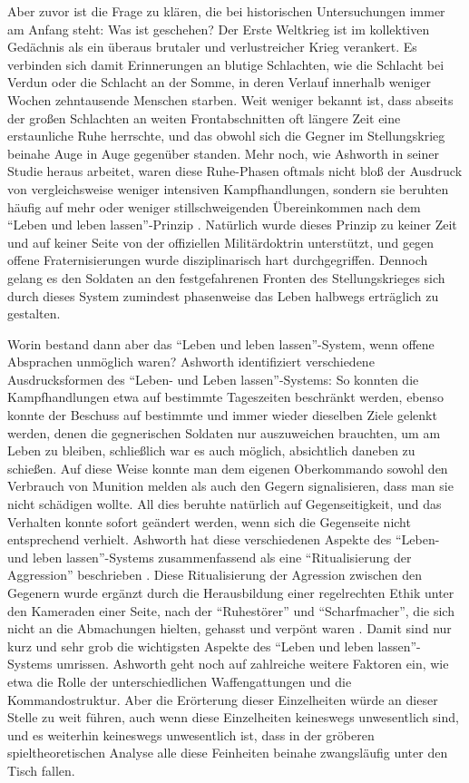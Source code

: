 \documentclass[12pt,a4paper,ngerman]{article}
\begin{document}
Aber zuvor ist die Frage zu klären, die bei historischen
Untersuchungen immer am Anfang steht: Was ist geschehen? Der
Erste Weltkrieg ist im kollektiven Gedächnis als ein überaus brutaler
und verlustreicher Krieg verankert. Es verbinden sich damit
Erinnerungen an blutige Schlachten, wie die Schlacht bei Verdun oder
die Schlacht an der Somme, in deren Verlauf innerhalb weniger Wochen
zehntausende Menschen starben\cite[S. 52]{james:2003}. Weit weniger
bekannt ist, dass abseits der großen Schlachten an weiten
Frontabschnitten oft längere Zeit eine erstaunliche Ruhe herrschte,
und das obwohl sich die Gegner im Stellungskrieg beinahe Auge in Auge
gegenüber standen. Mehr noch, wie Ashworth in seiner Studie heraus
arbeitet, waren diese Ruhe-Phasen oftmals nicht bloß der Ausdruck von
vergleichsweise weniger intensiven Kampfhandlungen, sondern sie
beruhten häufig auf mehr oder weniger stillschweigenden Übereinkommen
nach dem "`Leben und leben lassen"'-Prinzip
\cite[S. 24ff.]{ashworth:1980}. Natürlich wurde dieses Prinzip zu
keiner Zeit und auf keiner Seite von der offiziellen Militärdoktrin
unterstützt, und gegen offene Fraternisierungen wurde disziplinarisch
hart durchgegriffen. Dennoch gelang es den Soldaten an den
festgefahrenen Fronten des Stellungskrieges sich durch dieses System
zumindest phasenweise das Leben halbwegs erträglich zu gestalten.

Worin bestand dann aber das "`Leben und leben lassen"'-System, wenn
offene Absprachen unmöglich waren? Ashworth identifiziert verschiedene
Ausdrucksformen des "`Leben- und Leben lassen"'-Systems: So konnten
die Kampfhandlungen etwa auf bestimmte Tageszeiten beschränkt werden,
ebenso konnte der Beschuss auf bestimmte und immer wieder dieselben
Ziele gelenkt werden, denen die gegnerischen Soldaten nur auszuweichen
brauchten, um am Leben zu bleiben, schließlich war es auch möglich,
absichtlich daneben zu schießen. Auf diese Weise konnte man dem
eigenen Oberkommando sowohl den Verbrauch von Munition melden als
auch den Gegern signalisieren, dass man sie nicht schädigen wollte. All
dies beruhte natürlich auf Gegenseitigkeit, und das Verhalten konnte
sofort geändert werden, wenn sich die Gegenseite nicht entsprechend
verhielt. Ashworth hat diese verschiedenen Aspekte des "`Leben- und leben
lassen"'-Systems zusammenfassend als eine "`Ritualisierung der
Aggression"' beschrieben \cite[S. 99ff.]{ashworth:1980}. Diese
Ritualisierung der Agression zwischen den Gegenern wurde ergänzt durch die
Herausbildung einer regelrechten Ethik unter den Kameraden einer Seite, nach
der "`Ruhestörer"' und "`Scharfmacher"', die sich nicht an die Abmachungen
hielten, gehasst und verpönt waren \cite[S. 135ff.]{ashworth:1980}.
Damit sind nur kurz und sehr grob die wichtigsten Aspekte des "`Leben und leben
lassen"'-Systems umrissen. Ashworth geht noch auf zahlreiche weitere Faktoren
ein, wie etwa die Rolle der unterschiedlichen Waffengattungen und die
Kommandostruktur. Aber die Erörterung dieser
Einzelheiten würde an dieser Stelle zu weit führen, auch wenn diese
Einzelheiten keineswegs unwesentlich sind, und es weiterhin keineswegs
unwesentlich ist, dass in der gröberen spieltheoretischen Analyse alle diese
Feinheiten beinahe zwangsläufig unter den Tisch fallen. 
\end{document}
